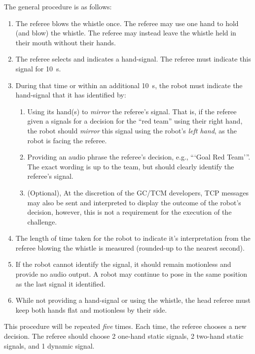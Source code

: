         The general procedure is as follows:

        \begin{enumerate}
            \item The referee blows the whistle once. The referee may use one hand to hold (and blow) the whistle. The referee may instead leave the whistle held in their mouth without their hands.
            \item The referee selects and indicates a hand-signal. The referee must indicate this signal for \qty{10}{\second}. 
            \item During that time or within an additional \qty{10}{\second}, the robot must indicate the hand-signal that it has identified by:
            \begin{enumerate}
                \item Using its hand(s) to \emph{mirror} the referee's signal. That is, if the referee given a signals for a decision for the ``red team'' using their right hand, the robot should \emph{mirror} this signal using the robot's \emph{left hand}, as the robot is facing the referee.
                \item Providing an audio phrase the referee's decision, e.g., ```Goal Red Team'''.  The exact wording is up to the team, but should clearly identify the referee's signal.
                \item (Optional), At the discretion of the GC/TCM developers, TCP messages may also be sent and interpreted to display the outcome of the robot's decision, however, this is not a requirement for the execution of the challenge. 
            \end{enumerate}
            \item The length of time taken for the robot to indicate it's interpretation from the referee blowing the whistle is measured (rounded-up to the nearest second).
            \item If the robot cannot identify the signal, it should remain motionless and provide no audio output. A robot may continue to pose in the same position as the last signal it identified.
            \item While not providing a hand-signal or using the whistle, the head referee must keep both hands flat and motionless by their side.
        \end{enumerate}

        This procedure will be repeated \textit{five} times. Each time, the referee chooses a new decision. The referee should choose 2 one-hand static signals, 2 two-hand static signals, and 1 dynamic signal.

